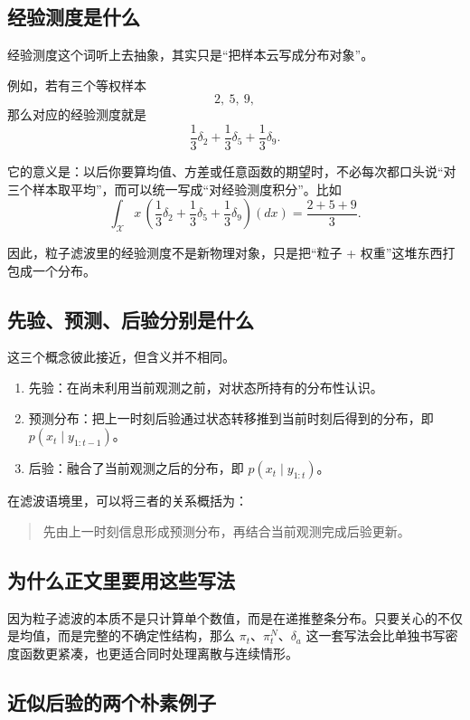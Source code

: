 \documentclass[12pt,a4paper]{ctexart}
\begin{document}
\subsection{经验测度是什么}

经验测度这个词听上去抽象，其实只是“把样本云写成分布对象”。

例如，若有三个等权样本
\[
2,\ 5,\ 9,
\]
那么对应的经验测度就是
\[
\frac13 \delta_2 + \frac13 \delta_5 + \frac13 \delta_9.
\]

它的意义是：以后你要算均值、方差或任意函数的期望时，不必每次都口头说“对三个样本取平均”，而可以统一写成“对经验测度积分”。比如
\[
\int_{\mathcal X} x\,
\left(
\frac13 \delta_2 + \frac13 \delta_5 + \frac13 \delta_9
\right)(dx)
= \frac{2+5+9}{3}.
\]

因此，粒子滤波里的经验测度不是新物理对象，只是把“粒子 + 权重”这堆东西打包成一个分布。

\subsection{先验、预测、后验分别是什么}

这三个概念彼此接近，但含义并不相同。

\begin{enumerate}
  \item 先验：在尚未利用当前观测之前，对状态所持有的分布性认识。
  \item 预测分布：把上一时刻后验通过状态转移推到当前时刻后得到的分布，即 \(p(x_t \mid y_{1:t-1})\)。
  \item 后验：融合了当前观测之后的分布，即 \(p(x_t \mid y_{1:t})\)。
\end{enumerate}

在滤波语境里，可以将三者的关系概括为：
\begin{quote}
先由上一时刻信息形成预测分布，再结合当前观测完成后验更新。
\end{quote}

\subsection{为什么正文里要用这些写法}

因为粒子滤波的本质不是只计算单个数值，而是在递推整条分布。只要关心的不仅是均值，而是完整的不确定性结构，那么 \(\pi_t\)、\(\pi_t^N\)、\(\delta_a\) 这一套写法会比单独书写密度函数更紧凑，也更适合同时处理离散与连续情形。

\subsection{近似后验的两个朴素例子}\label{app:posterior-examples}
\end{document}
